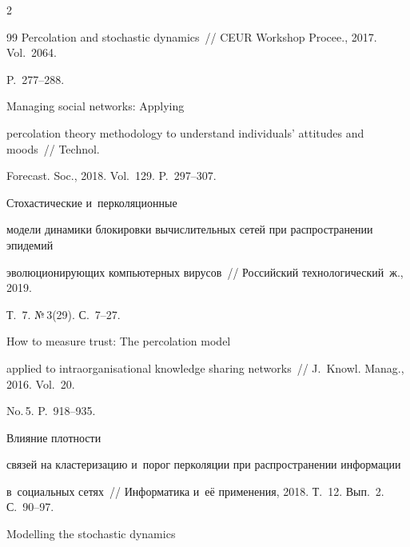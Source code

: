 \begin{multicols}{2}
{{\begin{thebibliography}{99}
Percolation and stochastic dynamics~// CEUR Workshop Procee., 2017. Vol.~2064. 


P.~277--288.







 Managing social networks: Applying 


percolation theory methodology to understand individuals' attitudes and moods~// Technol. 


Forecast. Soc., 2018. Vol.~129. P.~297--307.










 Стохастические и~перколяционные 


модели динамики блокировки вычислительных сетей при распространении эпидемий 


эволюционирующих компьютерных вирусов~// Российский технологический~ж., 2019. 


Т.~7. №\,3(29). С.~7--27.







 How to measure trust: The percolation model 


applied to intraorganisational knowledge sharing networks~// J.~Knowl. Manag., 2016. Vol.~20. 


No.\,5. P.~918--935.







 Влияние плотности 


связей на кластеризацию и~порог перколяции при распространении информации 


в~социальных сетях~// Информатика и~её применения, 2018. Т.~12. Вып.~2. С.~90--97.










 Modelling the stochastic dynamics 



\end{thebibliography}}}
\end{multicols}
